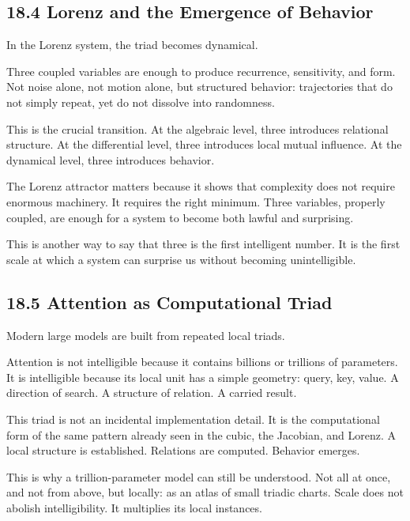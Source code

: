 \documentclass[
]{article}
\begin{document}
\hypertarget{lorenz-and-the-emergence-of-behavior}{%
\subsection{18.4 Lorenz and the Emergence of
Behavior}\label{lorenz-and-the-emergence-of-behavior}}

In the Lorenz system, the triad becomes dynamical.

Three coupled variables are enough to produce recurrence, sensitivity,
and form. Not noise alone, not motion alone, but structured behavior:
trajectories that do not simply repeat, yet do not dissolve into
randomness.

This is the crucial transition. At the algebraic level, three introduces
relational structure. At the differential level, three introduces local
mutual influence. At the dynamical level, three introduces behavior.

The Lorenz attractor matters because it shows that complexity does not
require enormous machinery. It requires the right minimum. Three
variables, properly coupled, are enough for a system to become both
lawful and surprising.

This is another way to say that three is the first intelligent number.
It is the first scale at which a system can surprise us without becoming
unintelligible.

\hypertarget{attention-as-computational-triad}{%
\subsection{18.5 Attention as Computational
Triad}\label{attention-as-computational-triad}}

Modern large models are built from repeated local triads.

Attention is not intelligible because it contains billions or trillions
of parameters. It is intelligible because its local unit has a simple
geometry: query, key, value. A direction of search. A structure of
relation. A carried result.

This triad is not an incidental implementation detail. It is the
computational form of the same pattern already seen in the cubic, the
Jacobian, and Lorenz. A local structure is established. Relations are
computed. Behavior emerges.

This is why a trillion-parameter model can still be understood. Not all
at once, and not from above, but locally: as an atlas of small triadic
charts. Scale does not abolish intelligibility. It multiplies its local
instances.
\end{document}
